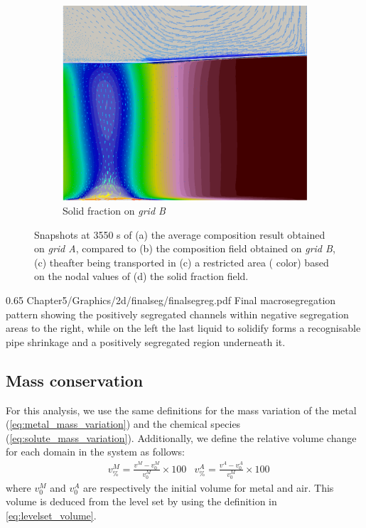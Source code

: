 \begin{figure}[H]
\begin{subfigure}[t]{0.4\textwidth}
  \includegraphics[width=\textwidth]{Chapter5/Graphics/2d/processed/1700s_gs_vl.png}
  \caption{Solid fraction on \emph{grid B}}
    \label{fig:1700s_gs}
  \end{subfigure}
\caption{Snapshots at 3550 s of (a) the average composition result obtained on \emph{grid A}, compared to (b) the composition field obtained on \emph{grid B}, 
(c) theafter being transported in (c) a restricted area ( color) based on the nodal values of (d) the solid fraction field.}
\label{fig:W_mask_1700s}
\end{figure}

\begin{figureth}
{0.65}
{Chapter5/Graphics/2d/finalseg/finalsegreg.pdf}
{Final macrosegregation pattern showing the positively segregated channels within negative segregation areas to the right,
while on the left the last liquid to solidify forms a recognisable pipe shrinkage and a positively segregated region underneath it.}
\label{fig:smacs_final}
\end{figureth}



\subsection{Mass conservation}

For this analysis, we use the same definitions for the mass variation of the metal (\cref{eq:metal_mass_variation}) and the chemical species (\cref{eq:solute_mass_variation}).
Additionally, we define the relative volume change for each domain in the system as follows:
\begin{align}
\label{eq:volume_variation}
&  v^M_\% = \frac{v^M - v^M_0}{v^M_0} \times 100	
&  v^A_\% = \frac{v^A - v^A_0}{v^M_0} \times 100	
\end{align}
where $v^M_0$ and $v^A_0$ are respectively the initial volume for metal and air. 
This volume is deduced from the level set by using the definition in \cref{eq:levelset_volume}.

